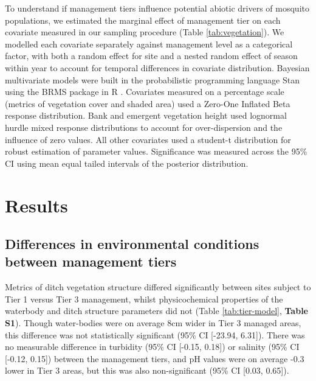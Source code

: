 \documentclass[lineno,sn-basic]{sn-jnl}%
\begin{document}
To understand if management tiers influence potential abiotic drivers of mosquito populations, we estimated the marginal effect of management tier on each covariate measured in our sampling procedure (Table \ref{tab:vegetation}). We modelled each covariate separately against management level as a categorical factor, with both a random effect for site and a nested random effect of season within year to account for temporal differences in covariate distribution. Bayesian multivariate models were built in the probabilistic programming language Stan using the BRMS package in R \citep{carpenterStanProbabilisticProgramming2017, burknerBrmsPackageBayesian2017}. Covariates measured on a percentage scale (metrics of vegetation cover and shaded area) used a Zero-One Inflated Beta response distribution. Bank and emergent vegetation height used lognormal hurdle mixed response distributions to account for over-dispersion and the influence of zero values. All other covariates used a student-t distribution for robust estimation of parameter values. Significance was measured across the 95\% CI using mean equal tailed intervals of the posterior distribution. 

\section{Results}\label{results}

\subsection{Differences in environmental conditions between management tiers}
Metrics of ditch vegetation structure differed significantly between sites subject to Tier 1 versus Tier 3 management, whilst physicochemical properties of the waterbody and ditch structure parameters did not (Table \ref{tab:tier-model}, \textbf{Table S1}). Though water-bodies were on average 8cm wider in Tier 3 managed areas, this difference was not statistically significant (95\% CI [-23.94, 6.31]). There was no measurable difference in turbidity (95\% CI [-0.15, 0.18]) or salinity (95\% CI [-0.12, 0.15]) between the management tiers, and pH values were on average -0.3 lower in Tier 3 areas, but this was also non-significant (95\% CI [0.03, 0.65]). 
\end{document}
